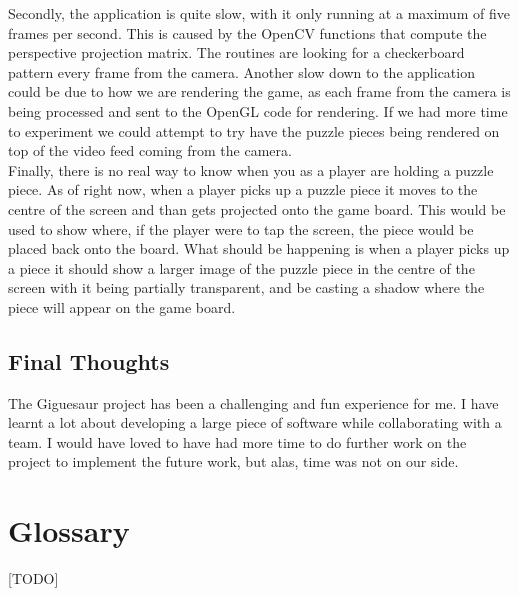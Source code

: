 \documentclass{article}
\begin{document}
Secondly, the application is quite slow, with it only running at a maximum of
five frames per second. This is caused by the OpenCV functions that compute the
perspective projection matrix. The routines are looking for a checkerboard
pattern every frame from the camera. Another slow down to the application could
be due to how we are rendering the game, as each frame from the camera is being
processed and sent to the OpenGL code for rendering. If we had more time to
experiment we could attempt to try have the puzzle pieces being rendered on top
of the video feed coming from the camera.\\

Finally, there is no real way to know when you as a player are holding a puzzle
piece. As of right now, when a player picks up a puzzle piece it moves to the
centre of the screen and than gets projected onto the game board. This would be
used to show where, if the player were to tap the screen, the piece would be
placed back onto the board. What should be happening is when a player picks up a
piece it should show a larger image of the puzzle piece in the centre of the
screen with it being partially transparent, and be casting a shadow where the
piece will appear on the game board.

\subsection{Final Thoughts}
The Giguesaur project has been a challenging and fun experience for me. I have
learnt a lot about developing a large piece of software while collaborating with
a team. I would have loved to have had more time to do further work on the
project to implement the future work, but alas, time was not on our side.


\clearpage




\clearpage
\section{Glossary}
[TODO]

\end{document}
